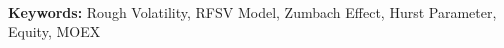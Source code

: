 


    \begin{titlepage}
        \maketitle
        
        \

        \

        \begin{abstract}
            
        \end{abstract}

        \

        \noindent
        \textbf{Keywords: } Rough Volatility, RFSV Model, Zumbach Effect, Hurst Parameter, Equity, MOEX
        \thispagestyle{empty}
    \end{titlepage}

    \tableofcontents
    \thispagestyle{empty}
    \clearpage

    
    \clearpage

    
    \clearpage

    
    \clearpage

    
    \clearpage

    
    \clearpage

    \printbibliography
